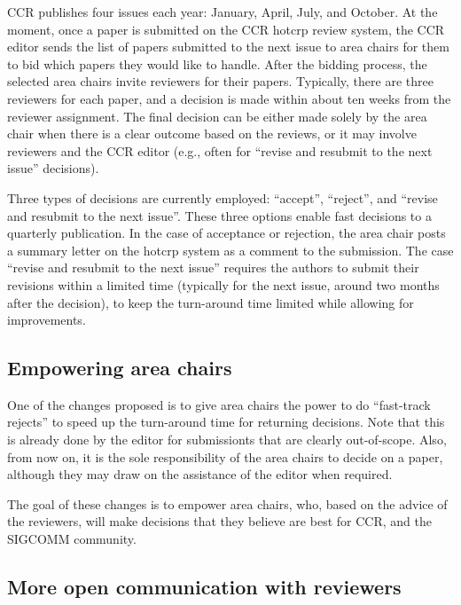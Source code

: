 \documentclass[sigconf]{acmart}
\begin{document}
CCR publishes four issues each year: January, April, July, and October.
At the moment, once a paper is submitted on the CCR hotcrp review system, the CCR editor sends the list of papers submitted to the next issue to area chairs for them to bid which papers they would like to handle. After the bidding process, the selected area chairs invite reviewers for their papers. Typically,  there are three reviewers for each paper, and a decision is made within about ten weeks from the reviewer assignment. The final decision can be either made solely by the area chair when there is a clear outcome based on the reviews, or it may involve reviewers and the CCR editor (e.g., often for ``revise and resubmit to the next issue'' decisions). 

Three types of decisions are currently employed: ``accept'', ``reject'', and ``revise and resubmit to the next issue''. These three options enable fast decisions to a quarterly publication.
In the case of acceptance or rejection, the area chair posts a summary letter on the hotcrp system as a comment to the submission. The case ``revise and resubmit to the next issue'' requires the authors to submit their revisions within a limited time (typically for the next issue, around two months after the decision), to keep the turn-around time limited while allowing for improvements.

\subsection{Empowering area chairs}
\label{subsec:area-chairs}

One of the changes proposed is to give area chairs the power to do ``fast-track rejects'' to speed up the turn-around time for returning decisions. Note that this is already done by the editor for submissionts that are clearly out-of-scope. Also, from now on, it is the sole responsibility of the area chairs to decide on a paper, although they may draw on the assistance of the editor when required.

The goal of these changes is to empower area chairs, who, based on the advice of the reviewers, will make decisions that they believe are best for CCR, and the SIGCOMM community.

\subsection{More open communication with reviewers}
\label{subsec:comm}
\end{document}
